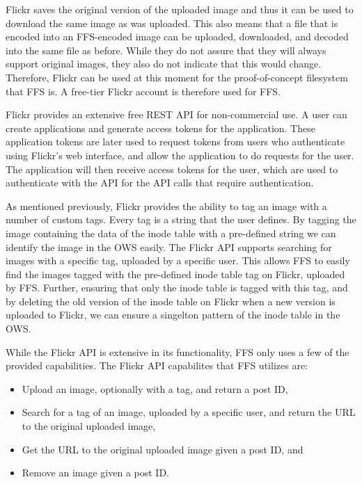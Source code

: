 Flickr saves the original version of the uploaded image and thus it can be used to download the same image as was uploaded. This also means that a file that is encoded into an FFS-encoded image can be uploaded, downloaded, and decoded into the same file as before. While they do not assure that they will always support original images, they also do not indicate that this would change. Therefore, Flickr can be used at this moment for the proof-of-concept filesystem that FFS is. A free-tier Flickr account is therefore used for FFS. 

Flickr provides an extensive free REST API for non-commercial use. A user can create applications and generate access tokens for the application. These application tokens are later used to request tokens from users who authenticate using Flickr's web interface, and allow the application to do requests for the user. The application will then receive access tokens for the user, which are used to authenticate with the API for the API calls that require authentication.

As mentioned previously, Flickr provides the ability to tag an image with a number of custom tags. Every tag is a string that the user defines. By tagging the image containing the data of the inode table with a pre-defined string we can identify the image in the OWS easily. The Flickr API supports searching for images with a specific tag, uploaded by a specific user. This allows FFS to easily find the images tagged with the pre-defined inode table tag on Flickr, uploaded by FFS. Further, ensuring that only the inode table is tagged with this tag, and by deleting the old version of the inode table on Flickr when a new version is uploaded to Flickr, we can ensure a singelton pattern of the inode table in the OWS. 

While the Flickr API is extensive in its functionality, FFS only uses a few of the provided capabilities. The Flickr API capabilites that FFS utilizes are:
\begin{itemize}
	\item Upload an image, optionally with a tag, and return a post ID,
	\item Search for a tag of an image, uploaded by a specific user, and return the URL to the original uploaded image,
	\item Get the URL to the original uploaded image given a post ID, and
	\item Remove an image given a post ID.
\end{itemize}

